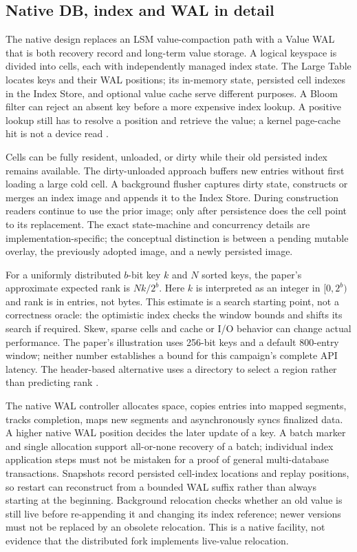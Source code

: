 \documentclass[11pt,a4paper]{article}
\begin{document}
\subsection{Native DB, index and WAL in detail}\label{sec:native-detail}
The native design replaces an LSM value-compaction path with a Value WAL that is both recovery record and long-term value storage. A logical keyspace is divided into cells, each with independently managed index state. The Large Table locates keys and their WAL positions; its in-memory state, persisted cell indexes in the Index Store, and optional value cache serve different purposes. A Bloom filter can reject an absent key before a more expensive index lookup. A positive lookup still has to resolve a position and retrieve the value; a kernel page-cache hit is not a device read \cite{tidehunter2026}.

Cells can be fully resident, unloaded, or dirty while their old persisted index remains available. The dirty-unloaded approach buffers new entries without first loading a large cold cell. A background flusher captures dirty state, constructs or merges an index image and appends it to the Index Store. During construction readers continue to use the prior image; only after persistence does the cell point to its replacement. The exact state-machine and concurrency details are implementation-specific; the conceptual distinction is between a pending mutable overlay, the previously adopted image, and a newly persisted image.

For a uniformly distributed $b$-bit key $k$ and $N$ sorted keys, the paper's approximate expected rank is $Nk/2^b$. Here $k$ is interpreted as an integer in $[0,2^b)$ and rank is in entries, not bytes. This estimate is a search starting point, not a correctness oracle: the optimistic index checks the window bounds and shifts its search if required. Skew, sparse cells and cache or I/O behavior can change actual performance. The paper's illustration uses 256-bit keys and a default 800-entry window; neither number establishes a bound for this campaign's complete API latency. The header-based alternative uses a directory to select a region rather than predicting rank \cite{tidehunter2026}.

The native WAL controller allocates space, copies entries into mapped segments, tracks completion, maps new segments and asynchronously syncs finalized data. A higher native WAL position decides the later update of a key. A batch marker and single allocation support all-or-none recovery of a batch; individual index application steps must not be mistaken for a proof of general multi-database transactions. Snapshots record persisted cell-index locations and replay positions, so restart can reconstruct from a bounded WAL suffix rather than always starting at the beginning. Background relocation checks whether an old value is still live before re-appending it and changing its index reference; newer versions must not be replaced by an obsolete relocation. This is a native facility, not evidence that the distributed fork implements live-value relocation.
\end{document}
